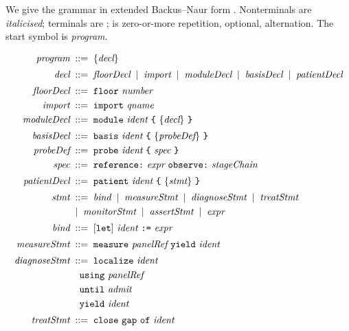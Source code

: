 We give the grammar in extended Backus--Naur form
\citep{backus1959,naur1963,aho2006compilers}. Nonterminals are
\textit{italicised}; terminals are ;  is zero-or-more
repetition, \cfckw{[x]} optional, \cfckw{|} alternation. The start symbol is
\textit{program}.

\begin{definition}
\label{cfc:def:grammar}
\begin{align*}
\textit{program} &\bnf \{\textit{decl}\}\\[2pt]
\textit{decl} &\bnf \textit{floorDecl}\alt\textit{import}\alt\textit{moduleDecl}
   \alt\textit{basisDecl}\alt\textit{patientDecl}\\[2pt]
\textit{floorDecl} &\bnf \cfckw{floor}\ \textit{number}\\
\textit{import} &\bnf \cfckw{import}\ \textit{qname}\\
\textit{moduleDecl} &\bnf \cfckw{module}\ \textit{ident}\ \cfckw{\{}\ \{\textit{decl}\}\ \cfckw{\}}\\[2pt]
\textit{basisDecl} &\bnf \cfckw{basis}\ \textit{ident}\ \cfckw{\{}\ \{\textit{probeDef}\}\ \cfckw{\}}\\
\textit{probeDef} &\bnf \cfckw{probe}\ \textit{ident}\ \cfckw{\{}\ \textit{spec}\ \cfckw{\}}\\
\textit{spec} &\bnf \cfckw{reference}\cfckw{:}\ \textit{expr}\ \cfckw{observe}\cfckw{:}\ \textit{stageChain}\\[2pt]
\textit{patientDecl} &\bnf \cfckw{patient}\ \textit{ident}\ \cfckw{\{}\ \{\textit{stmt}\}\ \cfckw{\}}\\[2pt]
\textit{stmt} &\bnf \textit{bind}\alt\textit{measureStmt}\alt\textit{diagnoseStmt}
   \alt\textit{treatStmt}\\
  &\alt\textit{monitorStmt}\alt\textit{assertStmt}\alt\textit{expr}\\[2pt]
\textit{bind} &\bnf [\cfckw{let}]\ \textit{ident}\ \cfckw{:=}\ \textit{expr}\\[2pt]
\textit{measureStmt} &\bnf \cfckw{measure}\ \textit{panelRef}\ \cfckw{yield}\ \textit{ident}\\[2pt]
\textit{diagnoseStmt} &\bnf \cfckw{localize}\ \textit{ident}\\
  &\quad \cfckw{using}\ \textit{panelRef}\\
  &\quad \cfckw{until}\ \textit{admit}\\
  &\quad \cfckw{yield}\ \textit{ident}\\[2pt]
\textit{treatStmt} &\bnf \cfckw{close}\ \cfckw{gap}\ \cfckw{of}\ \textit{ident}\\

\end{align*}
\end{definition}
